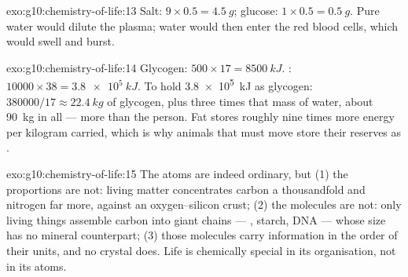 \begin{solution}{exo:g10:chemistry-of-life:13}
Salt: $9 \times 0.5 = \qty{4.5}{g}$; glucose: $1 \times 0.5 =
\qty{0.5}{g}$. Pure water would dilute the plasma; water would then
enter the red blood cells, which would swell and burst.
\end{solution}

\begin{solution}{exo:g10:chemistry-of-life:14}
Glycogen: $500 \times 17 = \qty{8500}{kJ}$. : $10000 \times 38 =
\qty{3.8e5}{kJ}$. To hold \qty{3.8e5}{kJ} as glycogen: $380000/17
\approx \qty{22.4}{kg}$ of glycogen, plus three times that mass of
water, about \qty{90}{kg} in all --- more than the person. Fat stores
roughly nine times more energy per kilogram carried, which is why
animals that must move store their reserves as .
\end{solution}

\begin{solution}{exo:g10:chemistry-of-life:15}
The atoms are indeed ordinary, but (1) the proportions are not: living
matter concentrates carbon a thousandfold and nitrogen far more,
against an oxygen--silicon crust; (2) the molecules are not: only
living things assemble carbon into giant chains --- , starch,
DNA --- whose size has no mineral counterpart; (3) those molecules
carry information in the order of their units, and no crystal does.
Life is chemically special in its organisation, not in its atoms.
\end{solution}

